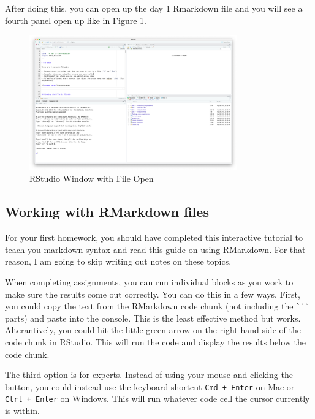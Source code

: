 \documentclass[12pt]{article}
\begin{document}
After doing this, you can open up the day 1 Rmarkdown file and you will see a fourth panel open up like in Figure \ref{fig:rstudio_open_file}.

\begin{figure}[!ht]
  \caption{RStudio Window with File Open}
  \label{fig:rstudio_open_file}
  \centering
  \includegraphics[width = 0.8\textwidth]{figures/rstudio_open_rmd.png}
\end{figure}

\subsection*{Working with RMarkdown files}

For your first homework, you should have completed this interactive tutorial to teach you \href{https://www.markdowntutorial.com/}{markdown syntax} and read this guide on \href{https://evalf21.classes.andrewheiss.com/resource/rmarkdown/}{using RMarkdown}. For that reason, I am going to skip writing out notes on these topics.

When completing assignments, you can run individual blocks as you work to make sure the results come out correctly. You can do this in a few ways. First, you could copy the text from the RMarkdown code chunk (not including the \`{}\`{}\`{} parts) and paste into the console. This is the least effective method but works. Alterantively, you could hit the little green arrow on the right-hand side of the code chunk in RStudio. This will run the code and display the results below the code chunk. 

The third option is for experts. Instead of using your mouse and clicking the button, you could instead use the keyboard shortcut \texttt{Cmd + Enter} on Mac or \texttt{Ctrl + Enter} on Windows. This will run whatever code cell the cursor currently is within.
\end{document}
